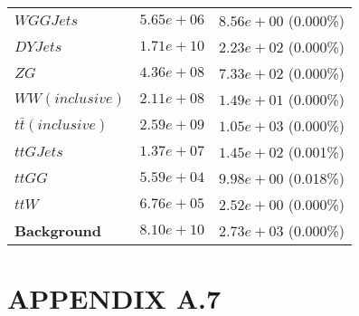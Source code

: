 \begin{table}
\begin{tabular}{ |l|c|c| }
                                 $WGGJets$ &  $5.65e+06$  &  $8.56e+00$ (0.000\%) \\
                                  $DYJets$ &  $1.71e+10$  &  $2.23e+02$ (0.000\%) \\
                                      $ZG$ &  $4.36e+08$  &  $7.33e+02$ (0.000\%) \\
                           $WW(inclusive)$ &  $2.11e+08$  &  $1.49e+01$ (0.000\%) \\
                    $t\bar{t} (inclusive)$ &  $2.59e+09$  &  $1.05e+03$ (0.000\%) \\
                                 $ttGJets$ &  $1.37e+07$  &  $1.45e+02$ (0.001\%) \\
                                    $ttGG$ &  $5.59e+04$  &  $9.98e+00$ (0.018\%) \\
                                     $ttW$ &  $6.76e+05$  &  $2.52e+00$ (0.000\%) \\
                       \textbf{Background} &  $8.10e+10$  &  $2.73e+03$ (0.000\%) \\
    \hline
    \end{tabular}
    \label{cutflow-doubletau}
\end{table}
\newpage


\section*{APPENDIX A.7}\label{App7}

